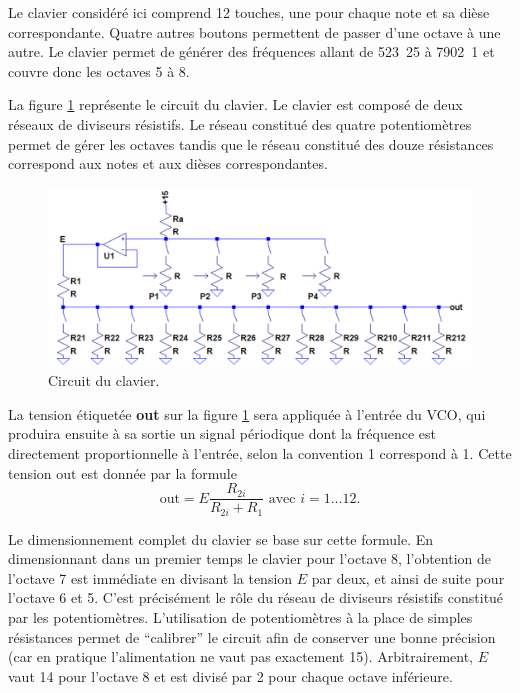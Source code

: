 
Le clavier considéré ici comprend 12 touches, une pour
chaque note et sa dièse correspondante. Quatre autres
boutons permettent de passer d'une octave à une autre.
Le clavier permet de générer des fréquences allant de
\unit{523.25}{\hertz} à \unit{7902.1}{\hertz} et couvre
donc les octaves 5 à 8.


La figure \ref{fig:keyboard-circuit} représente le
circuit du clavier. Le clavier est composé de deux
réseaux de diviseurs résistifs. Le réseau constitué
des quatre potentiomètres permet de gérer les octaves
tandis que le réseau constitué des douze résistances
correspond aux notes et aux dièses correspondantes.

\begin{figure}[ht]
	\centering
	\includegraphics[scale=0.55]{kb-img/keyboard-circuit.png}
	\caption{Circuit du clavier.}
	\label{fig:keyboard-circuit}
\end{figure}

La tension étiquetée \textbf{out} sur la figure
\ref{fig:keyboard-circuit} sera appliquée à l'entrée
du VCO, qui produira ensuite à sa sortie un signal
périodique dont la fréquence est directement 
proportionnelle à l'entrée, selon la convention
\unit{1}{\milli\volt} correspond à \unit{1}{\hertz}. Cette
tension $\text{out}$ est donnée par la formule 
\[ \text{out} = E\frac{R_{2i}}{R_{2i} + R_1} \text{  avec  } i = 1\dots12. \]

Le dimensionnement complet du clavier se base
sur cette formule. En dimensionnant dans un premier
temps le clavier pour l'octave 8, l'obtention
de l'octave 7 est immédiate en divisant la tension
$E$ par deux, et ainsi de suite pour l'octave 6 et 5.
C'est précisément le rôle du réseau de diviseurs
résistifs constitué par les potentiomètres. L'utilisation
de potentiomètres à la place de simples résistances
permet de ``calibrer'' le circuit afin de conserver
une bonne précision (car en pratique l'alimentation
ne vaut pas exactement \unit{15}{\volt}).
Arbitrairement, $E$ vaut \unit{14}{\volt} pour l'octave
8 et est divisé par 2 pour chaque octave inférieure.

